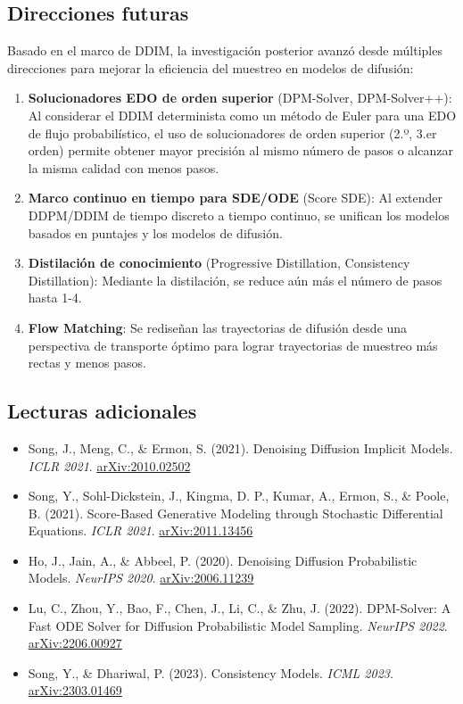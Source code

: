 \documentclass[a4paper]{article}
\begin{document}
\subsection{Direcciones futuras}

Basado en el marco de DDIM, la investigación posterior avanzó desde múltiples direcciones para mejorar la eficiencia del muestreo en modelos de difusión:

\begin{enumerate}
    \item \textbf{Solucionadores EDO de orden superior} (DPM-Solver, DPM-Solver++): Al considerar el DDIM determinista como un método de Euler para una EDO de flujo probabilístico, el uso de solucionadores de orden superior (2.º, 3.er orden) permite obtener mayor precisión al mismo número de pasos o alcanzar la misma calidad con menos pasos.
    \item \textbf{Marco continuo en tiempo para SDE/ODE} (Score SDE): Al extender DDPM/DDIM de tiempo discreto a tiempo continuo, se unifican los modelos basados en puntajes y los modelos de difusión.
    \item \textbf{Distilación de conocimiento} (Progressive Distillation, Consistency Distillation): Mediante la distilación, se reduce aún más el número de pasos hasta 1-4.
    \item \textbf{Flow Matching}: Se rediseñan las trayectorias de difusión desde una perspectiva de transporte óptimo para lograr trayectorias de muestreo más rectas y menos pasos.
\end{enumerate}

\subsection{Lecturas adicionales}

\begin{itemize}
    \item Song, J., Meng, C., \& Ermon, S. (2021). Denoising Diffusion Implicit Models. \textit{ICLR 2021}. \href{https://arxiv.org/abs/2010.02502}{arXiv:2010.02502}
    \item Song, Y., Sohl-Dickstein, J., Kingma, D. P., Kumar, A., Ermon, S., \& Poole, B. (2021). Score-Based Generative Modeling through Stochastic Differential Equations. \textit{ICLR 2021}. \href{https://arxiv.org/abs/2011.13456}{arXiv:2011.13456}
    \item Ho, J., Jain, A., \& Abbeel, P. (2020). Denoising Diffusion Probabilistic Models. \textit{NeurIPS 2020}. \href{https://arxiv.org/abs/2006.11239}{arXiv:2006.11239}
    \item Lu, C., Zhou, Y., Bao, F., Chen, J., Li, C., \& Zhu, J. (2022). DPM-Solver: A Fast ODE Solver for Diffusion Probabilistic Model Sampling. \textit{NeurIPS 2022}. \href{https://arxiv.org/abs/2206.00927}{arXiv:2206.00927}
    \item Song, Y., \& Dhariwal, P. (2023). Consistency Models. \textit{ICML 2023}. \href{https://arxiv.org/abs/2303.01469}{arXiv:2303.01469}
\end{itemize}

\end{document}
